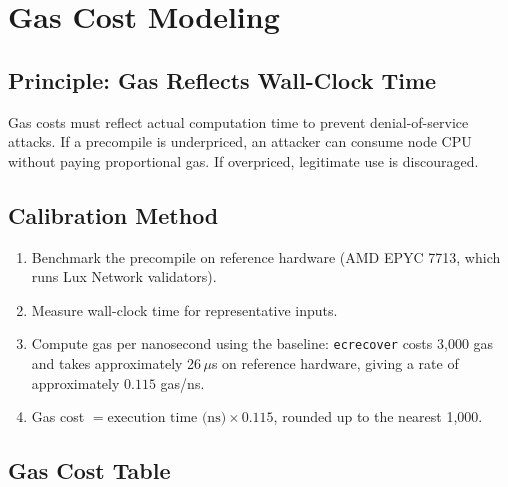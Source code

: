 \section{Gas Cost Modeling}


\subsection{Principle: Gas Reflects Wall-Clock Time}

Gas costs must reflect actual computation time to prevent denial-of-service attacks.
If a precompile is underpriced, an attacker can consume node CPU without paying
proportional gas. If overpriced, legitimate use is discouraged.

\subsection{Calibration Method}

\begin{enumerate}[nosep]
  \item Benchmark the precompile on reference hardware (AMD EPYC 7713, which runs Lux
    Network validators).
  \item Measure wall-clock time for representative inputs.
  \item Compute gas per nanosecond using the baseline: \texttt{ecrecover} costs 3,000 gas
    and takes approximately 26\,$\mu$s on reference hardware, giving a rate of approximately
    $0.115$ gas/ns.
  \item Gas cost $= \text{execution time (ns)} \times 0.115$, rounded up to the nearest
    1,000.
\end{enumerate}

\subsection{Gas Cost Table}

